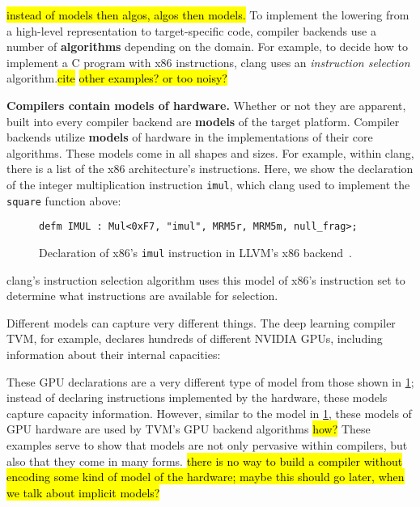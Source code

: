 \hl{instead of models then algos, algos then models.}
To implement the lowering
  from a high-level representation
  to target-specific code,
  compiler backends use a number of
  \textbf{algorithms}
  depending on the domain.
For example,
  to decide how to implement
  a C program with x86 instructions,
  clang uses an \textit{instruction selection}
  algorithm.\hl{cite}
\hl{other examples? or too noisy?}

\textbf{Compilers contain
  models o}\textbf{f hardware.}
Whether or not they are apparent,
  built into every compiler backend
  are \textbf{models}
  of the target platform.
Compiler backends 
  utilize \textbf{models} of hardware
  in the implementations 
  of their core algorithms.
These models come in all shapes
  and sizes.
For example,
  within clang, there is a list
  of the x86 architecture's
  instructions.
Here,
  we show the declaration of
  the integer multiplication
  instruction
  \texttt{imul},
  which clang used to implement
  the \texttt{square} function above:
  
\begin{figure}[H]
    \centering
\begin{verbatim}
defm IMUL : Mul<0xF7, "imul", MRM5r, MRM5m, null_frag>;
\end{verbatim}
\caption{
Declaration of x86's
  \texttt{imul}
  instruction in LLVM's x86 
  backend~\cite{llvmx86tablegen}.
}
    \label{fig:intro:llvm-tablegen}
\end{figure}

\noindent
clang's instruction selection algorithm
  uses
  this model of
  x86's instruction set
  to determine what instructions
  are available for selection.

Different models
  can capture very different things.
The deep learning compiler TVM,
  for example,
  declares 
  hundreds of different NVIDIA GPUs,
  including information
  about their internal capacities:



\noindent
These GPU declarations
  are a very different type of model
  from those shown in
  \cref{fig:intro:llvm-tablegen};
  instead of declaring instructions
  implemented by the hardware,
  these models capture
  capacity information.
However, similar to the model in 
  \cref{fig:intro:llvm-tablegen},
  these models of GPU hardware
  are used by TVM's GPU backend
  algorithms
  \hl{how?}
These examples serve to show
  that models are not only pervasive
  within compilers,
  but also that
  they come in many forms.
\hl{there is no way to build a compiler
  without encoding some kind 
  of model of the hardware;
  maybe this should go later, when we talk about implicit models?}

